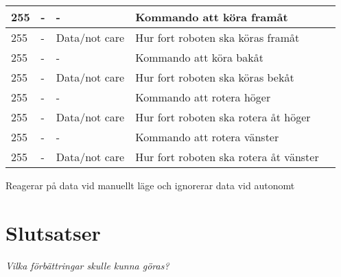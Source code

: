 \documentclass[11pt]{article}
\begin{document}
\begin{flushleft}
\begin{table}[h]
\begin{tabular}{|l|l|l|l|l|}
255 & - & - & Kommando att köra framåt \\ \hline
255 & - & Data/not care\text{*} & Hur fort roboten ska köras framåt \\ \hline
255 & - & - & Kommando att köra bakåt \\ \hline
255 & - & Data/not care & Hur fort roboten ska köras bekåt \\ \hline
255 & - & - & Kommando att rotera höger \\ \hline
255 & - & Data/not care & Hur fort roboten ska rotera åt höger  \\ \hline
255 & - & - & Kommando att rotera vänster \\ \hline
255 & - & Data/not care & Hur fort roboten ska rotera åt vänster  \\ \hline

\end{tabular}
\end{table}

\text{*} Reagerar på data vid manuellt läge och ignorerar data vid autonomt

\section{Slutsatser}
\textit{Vilka förbättringar skulle kunna göras?}

\pagebreak
{}



\pagebreak


\appendix

\end{flushleft}
\end{document}

